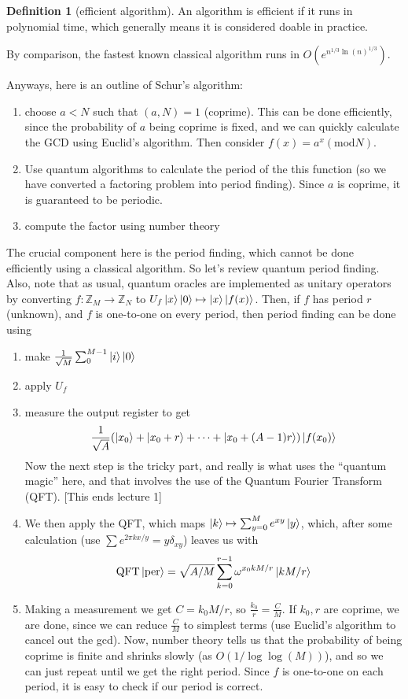 \documentclass{article}
\theoremstyle{definition}
\newtheorem{definition}{Definition}
\begin{document}
\begin{definition}[efficient algorithm]
  An algorithm is efficient if it runs in polynomial time, which generally means
  it is considered doable in practice.
\end{definition}

By comparison, the fastest known classical algorithm runs in
$O(e^{n^{1/3}\ln(n)^{1/3}})$.

Anyways, here is an outline of Schur's algorithm:

\begin{enumerate}
\item choose $a < N$ such that $(a, N) = 1$ (coprime). This can be done
  efficiently, since the probability of $a$ being coprime is fixed, and we can
  quickly calculate the GCD using Euclid's algorithm. Then consider $f(x) =
  a^x (\text{mod} N)$.
\item Use quantum algorithms to calculate the period of the this function
  (so we have converted a factoring problem into period finding). Since $a$
  is coprime, it is guaranteed to be periodic.
\item compute the factor using number theory
\end{enumerate}

The crucial component here is the period finding, which cannot be done
efficiently using a classical algorithm. So let's review quantum period finding.
Also, note that as usual, quantum oracles are implemented as unitary operators
by converting $f : \mathbb{Z}_M \to \mathbb{Z}_N$ to $U_f \ket{x} \ket{0}
\mapsto \ket{x} \ket{f(x)}$. Then, if $f$ has period $r$ (unknown), and $f$ is
one-to-one on every period, then period finding can be done using

\begin{enumerate}
\item make $\frac{1}{\sqrt{M}} \sum_0^{M - 1} \ket{i}\ket{0}$
\item apply $U_f$
\item measure the output register to get
  $$ \frac{1}{\sqrt{A}} (\ket{x_0} + \ket{x_0 + r} + \dots + \ket{x_0 + (A -
    1)r}) \ket{f(x_0)} $$
  Now the next step is the tricky part, and really is what uses the ``quantum
  magic'' here, and that involves the use of the Quantum Fourier Transform
  (QFT). [This ends lecture 1]
\item We then apply the QFT, which maps $\ket{k} \mapsto \sum_{y = 0}^M e^{xy}
  \ket{y}$, which, after some calculation (use $\sum e^{2\pi kx/y} =
  y\delta_{xy}$) leaves us with
$$ \text{QFT} \ket{\text{per}} = \sqrt{A / M} \sum_{k = 0}^{r - 1} \omega^{x_0 k
M/r} \ket{k M / r} $$
\item Making a measurement we get $C = k_0 M / r$, so $\frac{k_0}{r} =
  \frac{C}{M}$. If $k_0, r$ are coprime, we are done, since we can reduce
  $\frac{C}{M}$ to simplest terms (use Euclid's algorithm to cancel out the
  gcd). Now, number theory tells us that the probability of being coprime is
  finite and shrinks slowly (as $O(1 / \log \log (M))$), and so we can just
  repeat until we get the right period. Since $f$ is one-to-one on each period,
  it is easy to check if our period is correct.
\end{enumerate}
\end{document}
